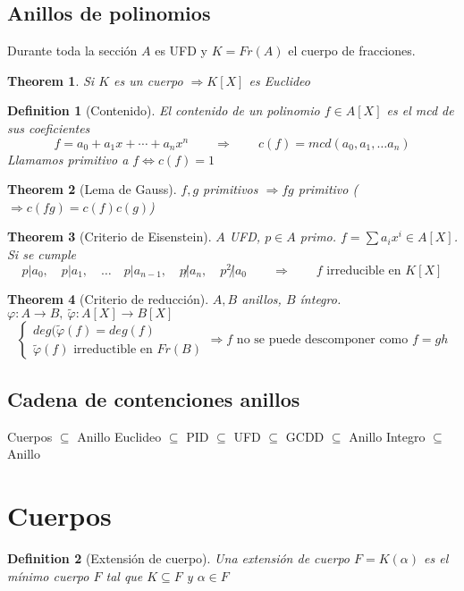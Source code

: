 \documentclass[leqno]{article}
\newtheorem*{theorem}{Theorem}
\newtheorem*{definition}{Definition}
\begin{document}
\subsection{Anillos de polinomios}
Durante toda la sección $A$ es UFD y  $K = Fr(A)$ el cuerpo de fracciones. 

\begin{theorem} Si $K$ es un cuerpo  $\Rightarrow K[X]$ es Euclideo
\end{theorem}

\begin{definition}[Contenido]
El contenido de un polinomio $f\in A[X]$ es el mcd de sus coeficientes
 \[
f = a_0 + a_1x+\cdots + a_nx^n \qquad \Rightarrow \qquad c(f) = mcd(a_0, a_1, \ldots a_n)
\] 
Llamamos primitivo a $f \iff c(f) = 1$
\end{definition}

\begin{theorem}[Lema de Gauss]
$f, g$ primitivos $\Rightarrow fg$ primitivo ($\Rightarrow c(fg)= c(f)c(g)$)
\end{theorem}

\begin{theorem}[Criterio de Eisenstein]
$A$ UFD, $p\in A$ primo. $f=\sum a_ix^i \in A[X]$. Si se cumple
\[
p|a_0,\quad p|a_1,\quad \ldots \quad p|a_{n-1},\quad p\not|a_n,\quad p^2\not|a_0 \qquad \Rightarrow \qquad f \text{ irreducible en } K[X]
\] 
\end{theorem}

\begin{theorem}[Criterio de reducción]
$A, B$ anillos, $B$ íntegro.  $\varphi :A \to  B, \ \tilde{\varphi }: A[X]\to B[X]$
\[
  \begin{cases}
    
deg(\tilde{\varphi }(f) = deg(f) \\ \tilde{\varphi }(f) \text{ irreductible en } Fr(B)
  \end{cases}
\Rightarrow f  \text{ no se puede descomponer como } f=gh
\] 
\end{theorem}

\subsection{Cadena de contenciones anillos}
Cuerpos $\subseteq $ Anillo Euclideo $\subseteq $ PID $\subseteq $ UFD $\subseteq $ GCDD $\subseteq $ Anillo Integro $\subseteq $ Anillo

\section{Cuerpos}
\begin{definition}[Extensión de cuerpo] Una extensión de cuerpo $F = K(\alpha )$ es el mínimo cuerpo $F$ tal que $K\subseteq F$ y $\alpha \in F$

\end{definition}
\end{document}
